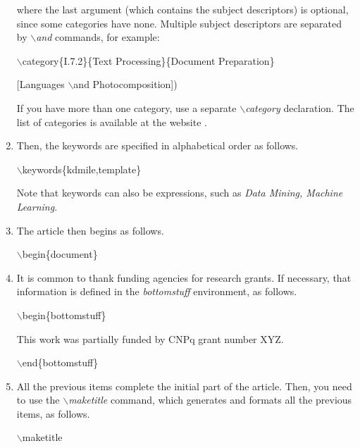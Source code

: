 \documentclass[kdmile,a4paper]{kdmile} %
\newenvironment{latexcode}
{\ttfamily\vspace{0.1in}\setlength{\parindent}{18pt}}
{\vspace{0.1in}}
\begin{document}
\begin{enumerate}
	where the last argument (which contains the subject descriptors) is optional, since some categories have none. 
	Multiple subject descriptors are separated by $\backslash$\textit{and} commands, for example:  
	\begin{latexcode}
	
	$\backslash$category\{I.7.2\}\{Text Processing\}\{Document Preparation\}
	
	[Languages $\backslash$and Photocomposition])
	\end{latexcode}
	
	If you have more than one category, use a separate $\backslash$\textit{category} declaration. 
	The list of categories is available at the website . \rmfamily

	\item Then, the keywords are specified in alphabetical order as follows.
	
	\begin{latexcode}
		$\backslash$keywords\{kdmile,template\}
	\end{latexcode}

	Note that keywords can also be expressions, such as \textit{Data Mining, Machine Learning}.

	\item The article then begins as follows.
	
	\begin{latexcode}
	   $\backslash$begin\{document\}
	\end{latexcode}
	
	\item It is common to thank funding agencies for research grants. If necessary, that information is defined in the \textit{bottomstuff} environment, as follows.
	
	\begin{latexcode}
		$\backslash$begin\{bottomstuff\}
	
		This work was partially funded by CNPq grant number XYZ. 
	
		$\backslash$end\{bottomstuff\}	
	\end{latexcode}
	
	\item All the previous items complete the initial part of the article. Then, you need to use the \textit{$\backslash$maketitle} command, which generates and formats all the previous items, as follows.
	
		\begin{latexcode}
	   $\backslash$maketitle
	\end{latexcode}
\end{enumerate}
\end{document}
